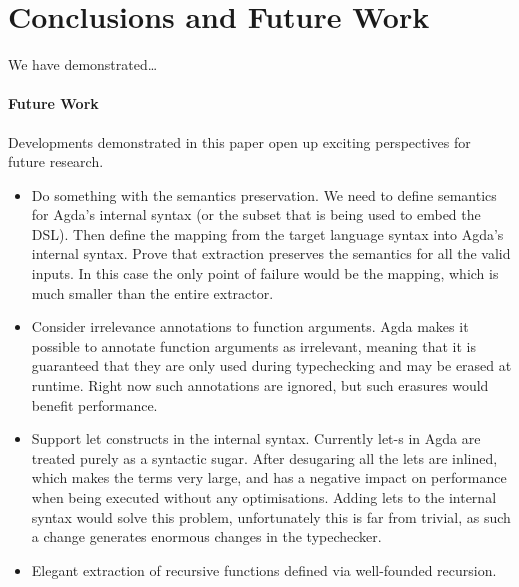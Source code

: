 \section{\label{sec:concl}Conclusions and Future Work}
We have demonstrated\dots

\paragraph{Future Work}
Developments demonstrated in this paper open up exciting perspectives
for future research.
\begin{itemize}
  \item Do something with the semantics preservation.  We need to
    define semantics for Agda's internal syntax (or the subset
    that is being used to embed the DSL).  Then define the mapping
    from the target language syntax into Agda's internal syntax.
    Prove that extraction preserves the semantics for all the valid
    inputs.  In this case the only point of failure would be the
    mapping, which is much smaller than the entire extractor.
  \item Consider irrelevance annotations to function arguments.
    Agda makes it possible to annotate function arguments as irrelevant,
    meaning that it is guaranteed that they are only used during
    typechecking and may be erased at runtime.  Right now such annotations
    are ignored, but such erasures would benefit performance.
  \item Support let constructs in the internal syntax.  Currently
    let-s in Agda are treated purely as a syntactic sugar.  After
    desugaring all the lets are inlined, which makes the terms
    very large, and has a negative impact on performance when
    being executed without any optimisations.  Adding lets to the
    internal syntax would solve this problem, unfortunately this is
    far from trivial, as such a change generates enormous changes
    in the typechecker.
  \item Elegant extraction of recursive functions defined via
    well-founded recursion.
\end{itemize}

